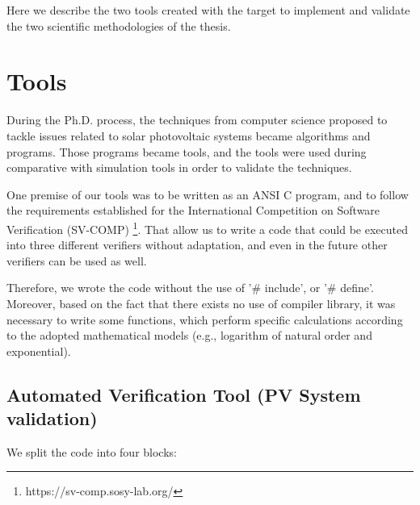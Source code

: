 Here we describe the two tools created with the target to implement and validate the two scientific methodologies of the thesis.

\section{Tools}

During the Ph.D. process, the techniques from computer science proposed to tackle issues related to solar photovoltaic systems became algorithms and programs. Those programs became tools, and the tools were used during comparative with simulation tools in order to validate the techniques.

One premise of our tools was to be written as an ANSI C program, and to follow the requirements established for the International Competition on Software Verification (SV-COMP) \footnote{https://sv-comp.sosy-lab.org/}. That allow us to write a code that could be executed into three different verifiers without adaptation, and even in the future other verifiers can be used as well.
%

Therefore, we wrote the code without the use of '\# include', or '\# define'. Moreover, based on the fact that there exists no use of compiler library, it was necessary to write some functions, which perform specific calculations according to the adopted mathematical models (e.g., logarithm of natural order and exponential).

\subsection{Automated Verification Tool (PV System validation)}
\label{sec:automatedverification}

We split the code into four blocks:

